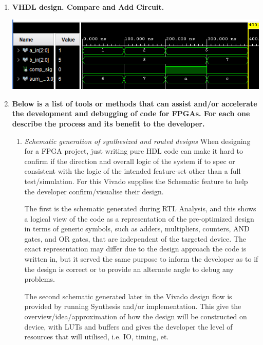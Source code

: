 \documentclass[11pt]{article}
\begin{document}
\begin{preview}
\begin{enumerate}
\begin{enumerate}
    \end{enumerate}

    \item \textbf{VHDL design. Compare and Add Circuit.}
    

    \includegraphics[width=\textwidth]{inc/sim.png}

    
    
    
    \item \textbf{Below is a list of tools or methods that can assist and/or accelerate the development and debugging of code for FPGAs. For each one describe the process and its benefit to the developer.}
    \begin{enumerate}
        \item \textit{Schematic generation of synthesized and routed designs}
        When designing for a FPGA project, just writing pure HDL code can make it hard to confirm if the direction and overall logic of the system if to spec or consistent with the logic of the intended feature-set other than a full test/simulation. For this Vivado supplies the Schematic feature to help the developer confirm/visualise their design.

        The first is the schematic generated during RTL Analysis, and this shows a logical view of the code as a representation of the pre-optimized design in terms of generic symbols, such as adders, multipliers, counters, AND gates, and OR gates, that are independent of the targeted device. The exact representation may differ due to the design approach the code is written in, but it served the same purpose to inform the developer as to if the design is correct or to provide an alternate angle to debug any problems.

        The second schematic generated later in the Vivado design flow is provided by running Synthesis and/or implementation. This give the overview/idea/approximation of how the design will be constructed on device, with LUTs and buffers and gives the developer the level of resources that will utilised, i.e. IO, timing, et.


\end{enumerate}
\end{enumerate}
\end{preview}
\end{document}
